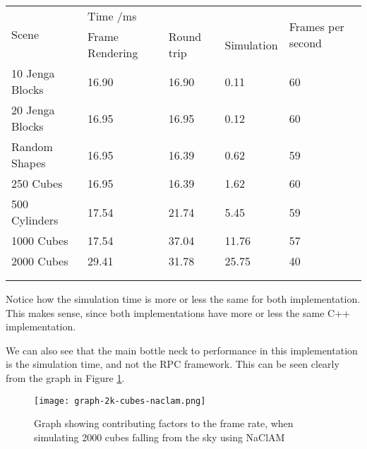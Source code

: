 \begin{table}[h]
\begin{tabular}{lllll}
\multirow{2}{*}{Scene}               & \multicolumn{3}{l}{Time /ms}              & \multirow{2}{*}{Frames per second} \\
                                     & Frame Rendering & Round trip & Simulation &                                    \\ \hline
\multicolumn{1}{l|}{10 Jenga Blocks} & 16.90           & 16.90      & 0.11       & 60                                 \\
\multicolumn{1}{l|}{20 Jenga Blocks} & 16.95           & 16.95      & 0.12       & 60                                 \\
\multicolumn{1}{l|}{Random Shapes}   & 16.95           & 16.39      & 0.62       & 59                                 \\
\multicolumn{1}{l|}{250 Cubes}       & 16.95           & 16.39      & 1.62       & 60                                 \\
\multicolumn{1}{l|}{500 Cylinders}   & 17.54           & 21.74      & 5.45       & 59                                 \\
\multicolumn{1}{l|}{1000 Cubes}      & 17.54           & 37.04      & 11.76      & 57                                 \\
\multicolumn{1}{l|}{2000 Cubes}      & 29.41           & 31.78      & 25.75      & 40                                 \\
                                     &                 &            &            &                                    \\
                                     &                 &            &            &                                   
\end{tabular}
\end{table}

Notice how the simulation time is more or less the same for both implementation. This makes sense, since both implementations have more or less the same C++ implementation.

We can also see that the main bottle neck to performance in this implementation is the simulation time, and not the RPC framework. This can be seen clearly from the graph in Figure \ref{fig:graph-2k-cubes-naclam}.

\begin{figure}
    \centering
    \texttt{[image: graph-2k-cubes-naclam.png]} 
    \caption{Graph showing contributing factors to the frame rate, when simulating 2000 cubes falling from the sky using NaClAM}
    \label{fig:graph-2k-cubes-naclam}
\end{figure}

